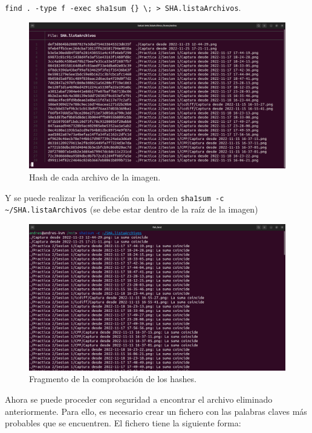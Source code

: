 \documentclass{article}
\begin{document}
\verb|find . -type f -exec sha1sum {} \; > SHA.listaArchivos|.

\begin{figure}[H]
    \centering
    \includegraphics[width=\textwidth]{imagenes/Captura desde 2022-12-02 18-41-07.png}
    \caption{Hash de cada archivo de la imagen.}
\end{figure}

\newpage

Y se puede realizar la verificación con la orden \verb|sha1sum -c ~/SHA.listaArchivos| (se debe estar dentro de la raíz de la imagen)

\begin{figure}[H]
    \centering
    \includegraphics[width=\textwidth]{imagenes/Captura desde 2022-12-02 18-43-28.png}
    \caption{Fragmento de la comprobación de los hashes.}
\end{figure}

Ahora se puede proceder con seguridad a encontrar el archivo eliminado anteriormente. Para ello, es necesario crear un fichero con las palabras claves más probables que se encuentren. El fichero tiene la siguiente forma:
\end{document}
